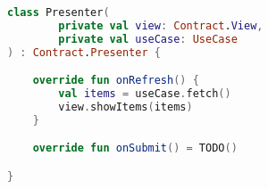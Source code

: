 \documentclass[10pt]{beamer}
\begin{document}
\begin{frame}[fragile]
\begin{lstlisting}[language=Kotlin, basicstyle=\ttfamily]
class Presenter(
        private val view: Contract.View,
        private val useCase: UseCase
) : Contract.Presenter {

    override fun onRefresh() {
        val items = useCase.fetch()
        view.showItems(items)
    }

    override fun onSubmit() = TODO()

}
\end{lstlisting}
\end{frame}



\begin{frame}[fragile]
\begin{lstlisting}[language=Kotlin, basicstyle=\ttfamily]
\end{lstlisting}
\end{frame}


\begin{frame}[fragile]
\begin{lstlisting}[language=Kotlin, basicstyle=\ttfamily]
\end{lstlisting}
\end{frame}

\begin{frame}[fragile]
\begin{lstlisting}[language=Kotlin, basicstyle=\ttfamily]
\end{lstlisting}
\end{frame}

\begin{frame}[fragile]
\begin{lstlisting}[language=Kotlin, basicstyle=\ttfamily]
\end{lstlisting}
\end{frame}


\begin{frame}[fragile]
\begin{lstlisting}[language=Kotlin, basicstyle=\ttfamily]
\end{lstlisting}
\end{frame}









\end{document}
